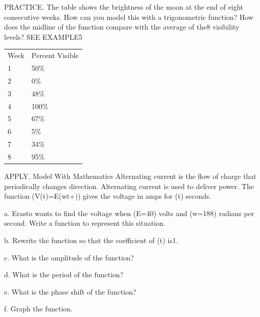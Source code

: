 \documentclass{article}
\newenvironment{practice}[2]{}{}        %
\newcommand{\answer}[1]{}               %
\newcommand{\placeholder}[2]{}          %
\newcommand{\te}[1]{}                   %
\begin{document}
\begin{practice}{23}{2}
PRACTICE. The table shows the brightness of the moon at the end of eight consecutive weeks. How can you model this with a trigonometric function? How does the midline of the function compare with the average of the8 visibility levels? SEE EXAMPLE5
\begin{tabular}{ll}
Week & Percent Visible \\
1 & 50\% \\
2 & 0\% \\
3 & 48\% \\
4 & 100\% \\
5 & 67\% \\
6 & 5\% \\
7 & 34\% \\
8 & 95\% \\
\end{tabular}
\placeholder{illustration}{Eight stacked moon-phase images on black starry backgrounds aligned with weeks1..8: left half illuminated;dark disk;right half illuminated;full moon;mostly left illuminated;thin left crescent;right crescent aboutthird;nearlyfull.}
\answer{(y=50\cos(\frac{7\pi}{15}x)+50); The average amount of moon visible during the8 weeks,about49.9\%,is nearly the same as the midline value of the function,50.}
\end{practice}
\begin{practice}{24}{2}
APPLY. Model With Mathematics Alternating current is the flow of charge that periodically changes direction. Alternating current is used to deliver power. The function (V(t)=E\cos(wt+\frac{})) gives the voltage in amps for (t) seconds.
\te{Printed voltage in amps; likely volts.}
a. Erasto wants to find the voltage when (E=40) volts and (w=188) radians per second. Write a function to represent this situation.
\answer{a. (V(t)=40\cos(188t+\frac\pi2))}
b. Rewrite the function so that the coefficient of (t) is1.
\answer{b. (V(t)=40\cos[188(t+\frac\pi{376})])}
c. What is the amplitude of the function?
\answer{c.40}
d. What is the period of the function?
\answer{d.(\pi/94)}
e. What is the phase shift of the function?
\answer{e.shift left(pi/376) units}
f. Graph the function.
\answer{f.Graph shown.}
\placeholder{graph}{Red40cos(188t+pi/2) on grid,arrowed axes horizontal x,vertical y,O; x labels-pi/48,pi/48,gridpi/144; y labels-40,-20,20,40,grid10;window-5pi/144..5pi/144,-50..50. Amplitude40,periodpi/94,descending throughorigin,sixcyclesapprox,end arrows.}
\end{practice}
\end{document}
